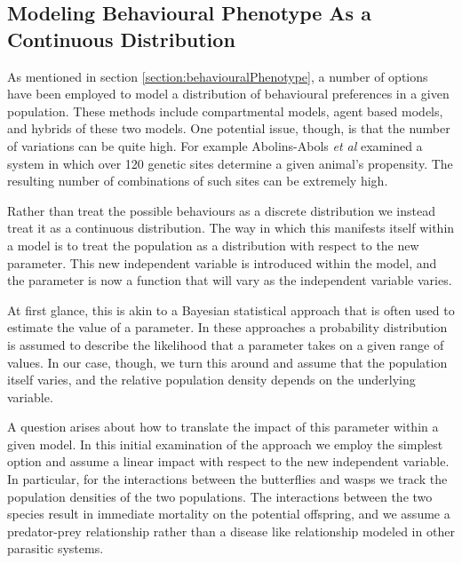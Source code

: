 \documentclass[12pt]{article}
\begin{document}
\subsection{Modeling Behavioural Phenotype As a Continuous
  Distribution}

As mentioned in section \ref{section:behaviouralPhenotype}, a number
of options have been employed to model a distribution of behavioural
preferences in a given population. These methods include compartmental
models, agent based models, and hybrids of these two models. One
potential issue, though, is that the number of variations can be quite
high. For example Abolins-Abols \textit{et al} examined a system in
which over 120 genetic sites determine a given animal's
propensity\cite{doi:10.1111/mec.14878}. The resulting number of
combinations of such sites can be extremely high.

Rather than treat the possible behaviours as a discrete distribution
we instead treat it as a continuous distribution. The way in which
this manifests itself within a model is to treat the population as a
distribution with respect to the new parameter. This new independent
variable is introduced within the model, and the parameter is now a
function that will vary as the independent variable varies.

At first glance, this is akin to a Bayesian statistical approach that
is often used to estimate the value of a
parameter\cite{doi:10.1111/j.1467-9868.2007.00610.x,Fitzpatrick_1991}. In
these approaches a probability distribution is assumed to describe the
likelihood that a parameter takes on a given range of values. In our
case, though, we turn this around and assume that the population
itself varies, and the relative population density depends on the
underlying variable.

A question arises about how to translate the impact of this parameter
within a given model. In this initial examination of the approach we
employ the simplest option and assume a linear impact with respect to
the new independent variable. In particular, for the interactions
between the butterflies and wasps we track the population densities of
the two populations. The interactions between the two species result
in immediate mortality on the potential offspring, and we assume a
predator-prey relationship rather than a disease like relationship
modeled in other parasitic systems.
\end{document}
